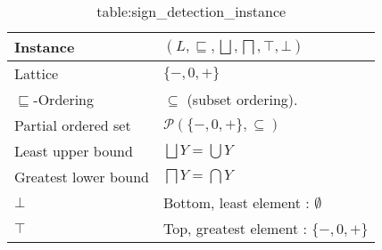 \begin{table}
\begin{tabular}{| l | l |}
  \hline
  Instance & $(L,\sqsubseteq,\bigsqcup, \bigsqcap, \top, \bot )$ \\
  \hline
  \hline
  Lattice  & $\{-,0,+\}$ \\
  \hline
  $\sqsubseteq$-Ordering  &  $\subseteq$ (subset ordering).\\
  \hline
  Partial ordered set    & $\mathcal{P}(\{-,0,+\}, \subseteq)$ \\
  \hline
  Least upper bound      & $\bigsqcup Y = \bigcup Y$\\
  \hline
  Greatest lower bound   & $\bigsqcap Y = \bigcap Y$\\
  \hline
  $\bot$                 & Bottom, least element : $\emptyset$\\
  \hline
  $\top$                 & Top, greatest element : $\{-,0,+\}$\\
\hline   
\end{tabular}
  \caption{table:sign_detection_instance}
  \centering
\end{table}

